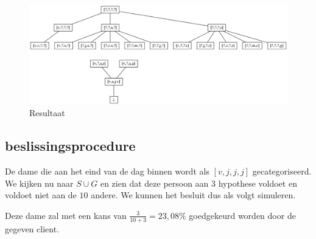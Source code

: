 \documentclass[alternative-exam.tex]{subfiles}
\begin{document}
\begin{figure}
\centering
\caption{Resultaat}
\label{resultaat}
\includegraphics[scale=0.5]{resources/graphs/resultaat.png}
\end{figure}

\subsection*{beslissingsprocedure}
De dame die aan het eind van de dag binnen wordt als $[v,j,j,j]$ gecategoriseerd.
We kijken nu naar $S\cup G$ en zien dat deze persoon aan $3$ hypothese voldoet en voldoet niet aan de $10$ andere. We kunnen het besluit dus als volgt simuleren.
\begin{center}
Deze dame zal met een kans van $\frac{3}{10+3} = 23,08 \%$ goedgekeurd worden door de gegeven client.
\end{center}
\end{document}

